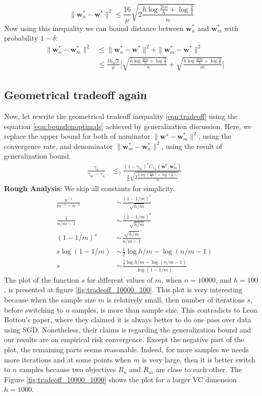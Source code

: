 \documentclass[11pt, a4paper, reqno, twoside]{scrartcl}
\theoremstyle{style}
\newcommand{\wv}{\bm{w}}
\newcommand{\0}{\mathbf{0}} %
\begin{document}
\begin{equation}
	\| \wv_n^* - \wv^* \|^2 \leq \frac{16}{\mu}  \sqrt{2 \frac{h \log \frac{2e
 	n}{h} + \log \frac{2}{\delta}}{n}}	 \nonumber
\end{equation}
Now using this inequality we can bound distance between $\wv_n^*$ and $\wv_m^*$
with probability $1-\delta$:
\begin{eqnarray}
	& \| \wv_n^* - \wv_m^* \|^2 & \leq \| \wv_n^* - \wv^* \|^2  + \| \wv_m^* -
	\wv^* \|^2 \nonumber\\ 
	& & \leq \frac{16 \sqrt{2}}{\mu} \bigg[ \sqrt{\frac{h \log \frac{2e
 	n}{h} + \log \frac{2}{\delta}}{n}} +  \sqrt{ \frac{h \log \frac{2e
 	m}{h} + \log \frac{2}{\delta}}{m}} \bigg] \label{eqn:boundonoptimals}
\end{eqnarray}
\subsection{Geometrical tradeoff again} 
Now, let rewrite the geometrical tradeoff inequality \ref{eqn:tradeoff} using
the equation \ref{eqn:boundonoptimals} achieved by generalization discussion.
Here, we replace the upper bound for both of nominator $\|\wv^s -
\wv_m^*\|^2$, using the convergence rate, and denominator $\|\wv_m^* - \wv_n^*
\|^2$, using the result of generalization bound.
\begin{eqnarray}
& \frac{\gamma_n}{\gamma_m - \gamma_n} & \leq_{?} \frac{(1-\gamma_m)^s
C_{\gamma_m}(\wv^0,\wv^*_m)}{\frac{8}{\mu}
	 \sqrt{2\frac{h\log(\frac{2m}{h})+\log(\frac{2}{\delta}))}{m}}}
	 \label{equ:ratio_tradeoff_theory}
\end{eqnarray}
\textbf{Rough Analysis}: We skip all constants for simplicity.
\begin{eqnarray}
	& \frac{n^{-1}}{m^{-1} - n^{-1}} & \sim \frac{(1-1/m)^s}{\sqrt{h/m}}
	\nonumber\\
	& \frac{1}{n/m - 1} & \sim \frac{(1-1/m)^s}{\sqrt{h/m}}
	\nonumber\\
	& (1-1/m)^s & \sim \frac{\sqrt{h/m}}{n/m - 1} \nonumber \\ 
	& s \log(1-1/m) & \sim \frac{1}{2}\log h/m - \log(n/m-1) \nonumber \\ 
	& s & \sim \frac{\frac{1}{2}\log h/m - \log(n/m-1)}{\log(1-1/m)}\nonumber
\end{eqnarray}
The plot of the function $s$ for different values of $m$, when $n = 10000$, and
$h = 100$, is presented at figure \ref{fig:tradeoff_10000_100}. This
plot is very interesting because when the sample size $m$ is relatively small, then
number of iterations $s$, before switching to $n$ samples, is more than sample
size.
This contradicts to Leon Bottou's paper, where they claimed it  is always better
to do one pass over data using SGD. Nonetheless, their claims is regarding
the generalization bound and our results are on empirical risk convergence.
Except the negative part of the plot, the remaining parts seems reasonable. Indeed, for more samples
we needs more iterations and at some points when $m$ is very large, then it is
better switch to $n$ samples because two objectives $R_n$ and $R_m$ are close to
each other. The Figure \ref{fig:tradeoff_10000_1000} shows the plot for a larger
VC dimension $h = 1000$.
\end{document}
